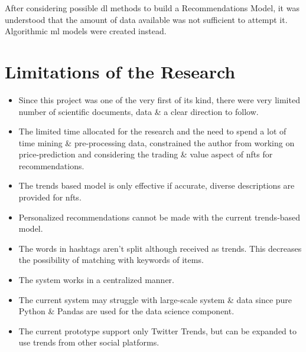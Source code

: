 After considering possible \gls{dl} methods to build a Recommendations Model, it was understood that the amount of data available was not sufficient to attempt it. Algorithmic \gls{ml} models were created instead.

\section{Limitations of the Research}
\begin{itemize}
\item Since this project was one of the very first of its kind, there were very limited number of scientific documents, data \& a clear direction to follow. 
\item  The limited time allocated for the research and the need to spend a lot of time mining \& pre-processing data, constrained the author from working on price-prediction and considering the trading \& value aspect of \gls{nft}s for recommendations.
\item The trends based model is only effective if accurate, diverse descriptions are provided for \gls{nft}s.
\item Personalized recommendations cannot be made with the current trends-based model.
\item The words in hashtags aren't split although received as trends. This decreases the possibility of matching with keywords of items.
\item The system works in a centralized manner.
\item The current system may struggle with large-scale system \& data since pure Python \& Pandas are used for the data science component.
\item The current prototype support only Twitter Trends, but can be expanded to use trends from other social platforms.
\end{itemize}


